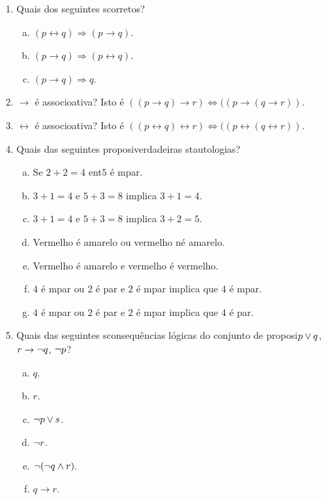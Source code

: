 \begin{enumerate}[{\bf 1.}]
\item Quais dos seguintes s\ao corretos?
\begin{enumerate}[a)]
\item $(p\leftrightarrow q)\Rightarrow(p\to q)$.
\item $(p\to q)\Rightarrow(p\leftrightarrow q)$.
\item $(p\to q)\Rightarrow q$.
\end{enumerate}

\item $\to$ \'e associoativa? Isto \'e $((p \to q) \to r)\iff((p \to (q \to r))$.

\item $\leftrightarrow$ \'e associoativa? Isto \'e $((p \leftrightarrow q) \leftrightarrow r)\iff((p \leftrightarrow (q \leftrightarrow r))$.

\item Quais das seguintes proposi\coes verdadeiras s\ao tautologias?
\begin{enumerate}[a)]
\item Se $2+2=4$ ent\ao $5$ \'e \ih mpar.
\item $3+1=4$ e $5+3=8$ implica $3+1=4$.
\item $3+1=4$ e $5+3=8$ implica $3+2=5$.
\item Vermelho \'e amarelo ou vermelho n\ao \'e amarelo.
\item Vermelho \'e amarelo e vermelho \'e vermelho.
\item $4$ \'e \ih mpar ou $2$ \'e par e $2$ \'e \ih mpar implica que $4$ \'e \ih mpar.
\item $4$ \'e \ih mpar ou $2$ \'e par e $2$ \'e \ih mpar implica que $4$ \'e par.
\end{enumerate}

\item Quais das seguintes s\ao consequ\^encias l\'ogicas do conjunto de proposi\coes $p\vee q$, $r\to\lnot q$, $\lnot p$?
\begin{enumerate}[a)]
\item $q$.
\item $r$.
\item $\lnot p\vee s$.
\item $\lnot r$.
\item $\lnot(\lnot q\wedge r)$.
\item $q\to r$.
\end{enumerate}
\end{enumerate}

